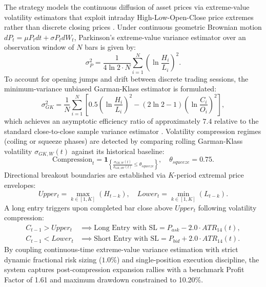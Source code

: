 \documentclass[11pt,a4paper]{article}
\begin{document}
The strategy models the continuous diffusion of asset prices via extreme-value volatility estimators that exploit intraday High-Low-Open-Close price extremes rather than discrete closing prices \cite{parkinson1980extreme, garman1980estimation}.
Under continuous geometric Brownian motion $dP_t = \mu P_t dt + \sigma P_t dW_t$, Parkinson's extreme-value variance estimator over an observation window of $N$ bars is given by:
\begin{equation}
\sigma_{P}^2 = \frac{1}{4 \ln 2 \cdot N} \sum_{i=1}^N \left(\ln \frac{H_i}{L_i}\right)^2.
\end{equation}
To account for opening jumps and drift between discrete trading sessions, the minimum-variance unbiased Garman-Klass estimator is formulated:
\begin{equation}
\sigma_{GK}^2 = \frac{1}{N} \sum_{i=1}^N \left[ 0.5 \left(\ln \frac{H_i}{L_i}\right)^2 - (2\ln 2 - 1)\left(\ln \frac{C_i}{O_i}\right)^2 \right],
\end{equation}
which achieves an asymptotic efficiency ratio of approximately $7.4$ relative to the standard close-to-close sample variance estimator \cite{garman1980estimation, bollerslev1986generalized}.
Volatility compression regimes (coiling or squeeze phases) are detected by comparing rolling Garman-Klass volatility $\sigma_{GK, W}(t)$ against its historical baseline:
\begin{equation}
\text{Compression}_t = \mathbf{1}_{\left\{ \frac{\sigma_{GK, W}(t)}{\bar{\sigma}_{GK, 2W}(t)} \le \theta_{squeeze} \right\}}, \quad \theta_{squeeze} = 0.75.
\end{equation}
Directional breakout boundaries are established via $K$-period extremal price envelopes:
\begin{equation}
Upper_t = \max_{k \in [1, K]} (H_{t-k}), \quad Lower_t = \min_{k \in [1, K]} (L_{t-k}).
\end{equation}
A long entry triggers upon completed bar close above $Upper_t$ following volatility compression:
\begin{align}
C_{t-1} > Upper_t & \implies \text{Long Entry with } \text{SL} = P_{ask} - 2.0 \cdot ATR_{14}(t), \\
C_{t-1} < Lower_t & \implies \text{Short Entry with } \text{SL} = P_{bid} + 2.0 \cdot ATR_{14}(t).
\end{align}
By coupling continuous-time extreme-value variance estimation with strict dynamic fractional risk sizing ($1.0\%$) and single-position execution discipline, the system captures post-compression expansion rallies with a benchmark Profit Factor of 1.61 and maximum drawdown constrained to 10.20\%.
\end{document}
